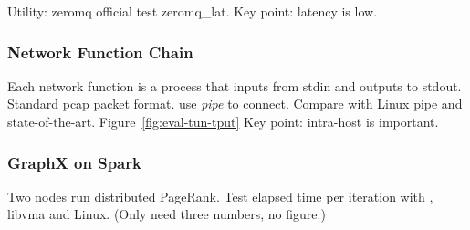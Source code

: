 Utility: zeromq official test zeromq\_lat.
Key point: latency is low.

\subsubsection{Network Function Chain}
\quad

Each network function is a process that inputs from stdin and outputs to stdout. Standard pcap packet format. use \emph{pipe} to connect. Compare with Linux pipe and state-of-the-art. Figure~\ref{fig:eval-tun-tput}
Key point: intra-host is important.

\subsubsection{GraphX on Spark}
\quad

Two nodes run distributed PageRank.
Test elapsed time per iteration with \sys{}, libvma and Linux. (Only need three numbers, no figure.)